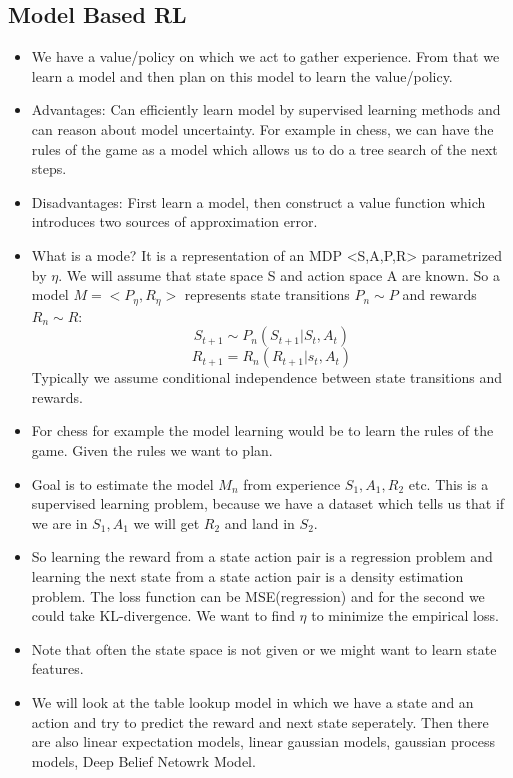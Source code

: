 \documentclass[a4paper]{article}
\begin{document}
    \subsection{Model Based RL}
    \begin{itemize}
        \item We have a value/policy on which we act to gather experience. From that we learn a model and then plan on this model to learn the value/policy. 
        \item Advantages: Can efficiently learn model by supervised learning methods and can reason about model uncertainty. For example in chess, we can have the rules of the game as a model which allows us to do a tree search of the next steps. 
        \item Disadvantages: First learn a model, then construct a value function which introduces two sources of approximation error. 
        \item What is a mode? It is a representation of an MDP <S,A,P,R> parametrized by $\eta$. We will assume that state space S and action space A are known. So a model $M = <P_{\eta}, R_{\eta}>$ represents  state transitions $P_n \sim P$ and rewards $R_n \sim R$: 
        $$S_{t+1} \sim P_n(S_{t+1}| S_t, A_t)$$
        $$R_{t+1} = R_n(R_{t+1}| s_t, A_t)$$
        Typically we assume conditional independence between state transitions and rewards. 
        \item For chess for example the model learning would be to learn the rules of the game. Given the rules we want to plan. 
        \item Goal is to estimate the model $M_n$ from experience $S_1, A_1, R_2$ etc. This is a supervised learning problem, because we have a dataset which tells us that if we are in $S_1, A_1$ we will get $R_2$ and land in $S_2$. 
        \item So learning the reward from a state action pair is a regression problem and learning the next state from a state action pair is a density estimation problem.  The loss function can be MSE(regression) and for the second we could take KL-divergence. We want to find $\eta$ to minimize the empirical loss. 
        \item Note that often the state space is not given or we might want to learn state features. 
        \item We will look at the table lookup model in which we  have a state and an action and try to predict the reward and next state seperately. Then there are also linear expectation models, linear gaussian models, gaussian process models, Deep Belief Netowrk Model. 

\end{itemize}
\end{document}
